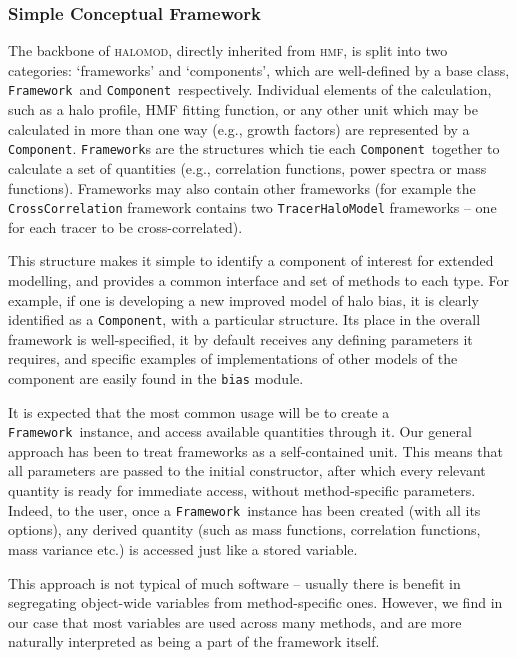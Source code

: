 \documentclass[5p,aas_macros]{elsarticle}
\newcommand{\framework}{\texttt{Framework}\xspace} %
\newcommand{\component}{\texttt{Component}\xspace} %
\begin{document}
\subsubsection{Simple Conceptual Framework}
\label{sec:halomod:overview:concept}
The backbone of \textsc{halomod}, directly inherited from \textsc{hmf}, is split into two categories: `frameworks' and `components', which are well-defined by a base class, \framework\ and \component\ respectively. Individual elements of the calculation, such as a halo profile, HMF fitting function, or any other unit which may be calculated in more than one way (e.g., growth factors) are represented by a \component. \texttt{Framework}s are the structures which tie each \component\ together to calculate a set of quantities (e.g., correlation functions, power spectra or mass functions). Frameworks may also contain other frameworks (for example the \texttt{Cross\-Correlation} framework contains two \texttt{TracerHaloModel} frameworks -- one for each tracer to be cross-correlated).

This structure makes it simple to identify a component of interest for extended modelling, and provides a common interface and set of methods to each type. For example, if one is developing a new improved model of halo bias, it is clearly identified as a \component, with a particular structure. Its place in the overall framework is well-specified, it by default receives any defining parameters it requires, and specific examples of implementations of other models of the component are easily found in the \verb|bias| module. 

It is expected that the most common usage will be to create a \framework\ instance, and access available quantities through it. Our general approach has been to treat frameworks as a self-contained unit. This means that all parameters are passed to the initial constructor, after which every relevant quantity is ready for immediate access, without method-specific parameters. Indeed, to the user, once a \framework\ instance has been created (with all its options), any derived quantity (such as mass functions, correlation functions, mass variance etc.) is accessed just like a stored variable. 

This approach is not typical of much software -- usually there is benefit in segregating object-wide variables from method-specific ones. However, we find in our case that most variables are used across many methods, and are more naturally interpreted as being a part of the framework itself. 
\end{document}
